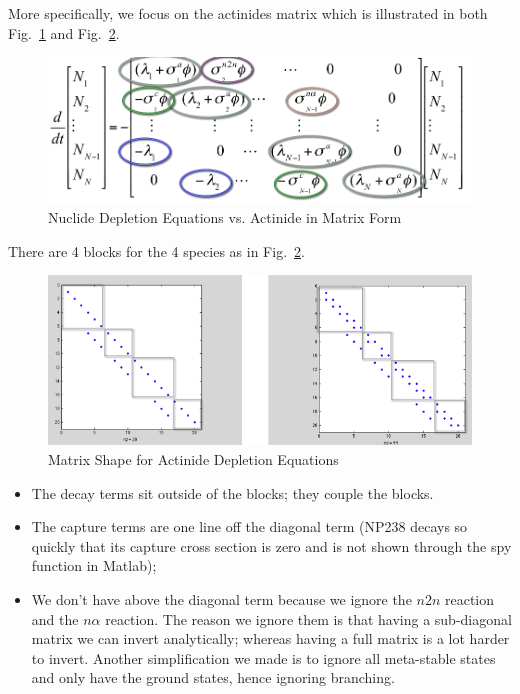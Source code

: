 \documentclass{school-22.211-notes}
\begin{document}
More specifically, we focus on the actinides matrix which is
illustrated in both Fig.~\ref{nuclide-depletion-matrix} and
Fig.~\ref{actinide-block}.

\begin{figure}[ht]
  \centering
  \includegraphics[width=5in]{images/dfs/nuclide-depletion-matrix-form.png}
  \caption{Nuclide Depletion Equations vs. Actinide in Matrix
    Form} \label{nuclide-depletion-matrix}
    \end{figure}
There are 4 blocks for the 4 species as in Fig.~\ref{actinide-block}. 
\begin{figure}[ht]
  \centering
  \includegraphics[width=5in]{images/dfs/actinide-block.png}
  \caption{Matrix Shape for Actinide Depletion
    Equations} \label{actinide-block}
    \end{figure}
\begin{itemize}
\item The decay terms sit outside of the blocks; they couple the blocks.
\item The capture terms are one line off the diagonal term (NP238
  decays so quickly that its capture cross section is zero and is not
  shown through the spy function in Matlab);
\item We don't have above the diagonal term because we ignore the
  $n2n$ reaction and the $n \alpha$ reaction. The reason we ignore
  them is that having a sub-diagonal matrix we can invert
  analytically; whereas having a full matrix is a lot harder to
  invert. Another simplification we made is to ignore all meta-stable
  states and only have the ground states, hence ignoring branching.
\end{itemize}
\end{document}
